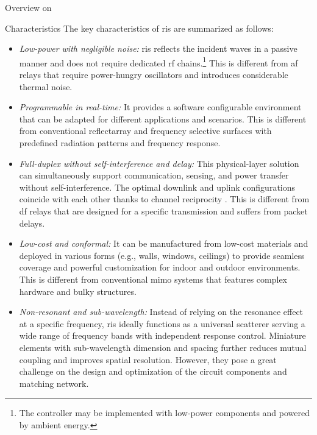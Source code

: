 \begin{section}{Overview on }
	\begin{subsection}{Characteristics}
		The key characteristics of \gls{ris} are summarized as follows:
		\begin{itemize}
			\item \emph{Low-power with negligible noise:} \gls{ris} reflects the incident waves in a passive manner and does not require dedicated \gls{rf} chains.\footnote{The controller may be implemented with low-power components and powered by ambient energy.} This is different from \gls{af} relays that require power-hungry oscillators and introduces considerable thermal noise.
			\item \emph{Programmable in real-time:} It provides a software configurable environment that can be adapted for different applications and scenarios. This is different from conventional reflectarray \cite{Nayeri2018} and frequency selective surfaces \cite{Anwar2018} with predefined radiation patterns and frequency response.
			\item \emph{Full-duplex without self-interference and delay:} This physical-layer solution can simultaneously support communication, sensing, and power transfer without self-interference. The optimal downlink and uplink configurations coincide with each other thanks to channel reciprocity \cite{Wu2021}. This is different from \gls{df} relays that are designed for a specific transmission and suffers from packet delays.
			\item \emph{Low-cost and conformal:} It can be manufactured from low-cost materials and deployed in various forms (e.g., walls, windows, ceilings) to provide seamless coverage and powerful customization for indoor and outdoor environments. This is different from conventional \gls{mimo} systems that features complex hardware and bulky structures.
			\item \emph{Non-resonant and sub-wavelength:} Instead of relying on the resonance effect at a specific frequency, \gls{ris} ideally functions as a universal scatterer serving a wide range of frequency bands with independent response control. Miniature elements with sub-wavelength dimension and spacing further reduces mutual coupling and improves spatial resolution. However, they pose a great challenge on the design and optimization of the circuit components and matching network.
		\end{itemize}
	\end{subsection}


\end{section}
